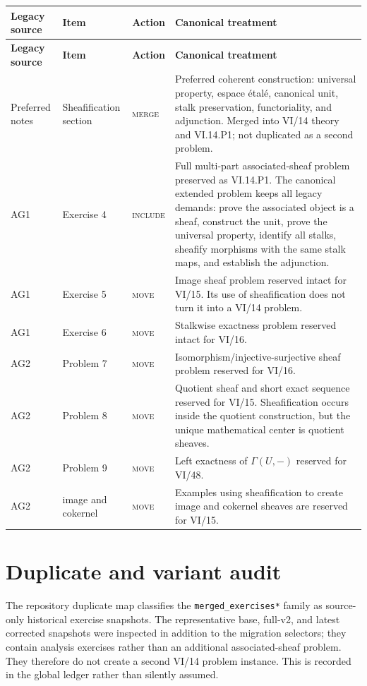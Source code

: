\begin{longtable}{p{}p{}p{}p{}}
\toprule
\textbf{Legacy source} & \textbf{Item} & \textbf{Action} & \textbf{Canonical treatment}\\
\midrule
\endfirsthead
\toprule
\textbf{Legacy source} & \textbf{Item} & \textbf{Action} & \textbf{Canonical treatment}\\
\midrule
\endhead
Preferred notes & Sheafification section & \textsc{merge} &
Preferred coherent construction: universal property, espace \'{e}tal\'{e}, canonical unit,
stalk preservation, functoriality, and adjunction.  Merged into VI/14 theory and VI.14.P1;
not duplicated as a second problem.\\

AG1 & Exercise 4 & \textsc{include} &
Full multi-part associated-sheaf problem preserved as VI.14.P1.  The canonical extended problem keeps
all legacy demands: prove the associated object is a sheaf, construct the unit, prove the
universal property, identify all stalks, sheafify morphisms with the same stalk maps, and
establish the adjunction.\\

AG1 & Exercise 5 & \textsc{move} &
Image sheaf problem reserved intact for VI/15.  Its use of sheafification does not turn it
into a VI/14 problem.\\

AG1 & Exercise 6 & \textsc{move} &
Stalkwise exactness problem reserved intact for VI/16.\\

AG2 & Problem 7 & \textsc{move} &
Isomorphism/injective-surjective sheaf problem reserved for VI/16.\\

AG2 & Problem 8 & \textsc{move} &
Quotient sheaf and short exact sequence reserved for VI/15.  Sheafification occurs inside
the quotient construction, but the unique mathematical center is quotient sheaves.\\

AG2 & Problem 9 & \textsc{move} &
Left exactness of $\Gamma(U,-)$ reserved for VI/48.\\

AG2 & image and cokernel & \textsc{move} &
Examples using sheafification to create image and cokernel sheaves are reserved for VI/15.\\
\bottomrule
\end{longtable}

\section*{Duplicate and variant audit}
The repository duplicate map classifies the \texttt{merged\_exercises*} family as
source-only historical exercise snapshots.  The representative base, full-v2, and latest
corrected snapshots were inspected in addition to the migration selectors; they contain
analysis exercises rather than an additional associated-sheaf problem.  They therefore do
not create a second VI/14 problem instance.  This is recorded in the global ledger rather
than silently assumed.

